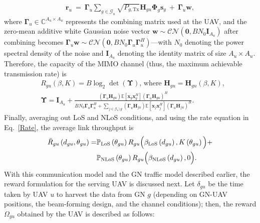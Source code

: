 \documentclass[10pt, twocolumn]{IEEEtran}
\begin{document}
\vspace{1mm}
\begin{align}\label{Rx_signal}
    \mathbf{r}_{u}\ =\ \boldsymbol{\Gamma}_{u} \sum_{g{\in}\mathcal{G}_{u}} \sqrt{P_{g,\mathrm{Tx}}}\mathbf{H}_{gu}\boldsymbol{\Phi}_{g}\mathbf{s}_{g}\ +\ \boldsymbol{\Gamma}_{u}\mathbf{w},
\end{align}
where $\boldsymbol{\Gamma}_{u}{\in}\mathbb{C}^{A_{u}{\times}A_{u}}$ represents the combining matrix used at the UAV, and the zero-mean additive white Gaussian noise vector $\mathbf{w}{\sim}\mathcal{CN}(\mathbf{0},BN_{0}\mathbf{I}_{A_{u}})$ after combining becomes $\boldsymbol{\Gamma}_{u}\mathbf{w}{\sim}\mathcal{CN}(\mathbf{0},BN_{0}\boldsymbol{\Gamma}_{u}\boldsymbol{\Gamma}_{u}^{H})$---with $N_{0}$ denoting the power spectral density of the noise and $\mathbf{I}_{A_{u}}$ denoting the identity matrix of size $A_{u}{\times}A_{u}$. Therefore, the capacity of the MIMO channel (thus, the maximum achievable transmission rate) is
\vspace{1mm}
\begin{align}\label{Rate}
    &R_{gu}(\beta,K) = B\log_{2}\det{\left(\boldsymbol{\Upsilon}\right)}\text{, where }\mathbf{H}_{gu}{=}\mathbf{H}_{gu}(\beta,K),\\
    &\boldsymbol{\Upsilon}{=}\mathbf{I}_{A_{u}}{+}\frac{\left(\boldsymbol{\Gamma}_{u}\mathbf{H}_{gu}\right)\mathbb{E}\left[\mathbf{x}_{g}\mathbf{x}_{g}^{H}\right]\left(\boldsymbol{\Gamma}_{u}\mathbf{H}_{gu}\right)^{H}}{BN_{0}\boldsymbol{\Gamma}_{u}\boldsymbol{\Gamma}_{u}^{H}{+}\underset{j{\in}\mathcal{G}_{u}{\setminus}g}{\sum}\left(\boldsymbol{\Gamma}_{u}\mathbf{H}_{ju}\right)\mathbb{E}\left[\mathbf{x}_{j}\mathbf{x}_{j}^{H}\right]\left(\boldsymbol{\Gamma}_{u}\mathbf{H}_{ju}\right)^{H}}.\nonumber
\end{align}
Finally, averaging out LoS and NLoS conditions, and using the rate equation in Eq.~\eqref{Rate}, the average link throughput is
\begin{align}\label{throughput}
    \Bar{R}_{gu}\left(d_{gu},\theta_{gu}\right) = &\mathbb{P}_{\mathrm{LoS}}\left(\theta_{gu}\right)R_{gu}\Big(\beta_{\mathrm{LoS}}\left(d_{gu}\right),K\left(\theta_{gu}\right)\Big) + \nonumber\\&\mathbb{P}_{\mathrm{NLoS}}\left(\theta_{gu}\right)R_{gu}\Big(\beta_{\mathrm{NLoS}}\left(d_{gu}\right),0\Big).
\end{align}
With this communication model and the GN traffic model described earlier, the reward formulation for the serving UAV is discussed next. Let $\delta_{gu}$ be the time taken by UAV $u$ to harvest the data from GN $g$ (depending on GN-UAV positions, the beam-forming design, and the channel conditions); then, the reward $\Omega_{gu}$ obtained by the UAV is described as follows:
\end{document}
